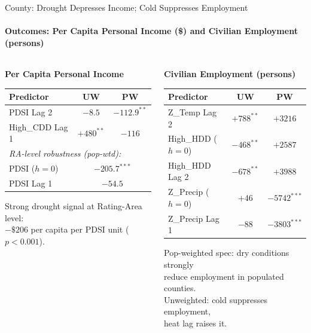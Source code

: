 \documentclass[aspectratio=169,11pt]{beamer}
\newcommand{\emphcolor}[1]{{\color{WarmOrange}\textbf{#1}}}
\newcommand{\tealtext}[1]{{\color{Teal}#1}}
\newcommand{\graytext}[1]{{\color{WarmGray}#1}}
\begin{document}
\begin{frame}{County: Drought Depresses Income; Cold Suppresses Employment}
  \framesubtitle{Outcomes: Per Capita Personal Income (\$) and Civilian Employment (persons)}
  \small
  \begin{columns}[T]
    \begin{column}{0.47\textwidth}
      \tealtext{\textbf{Per Capita Personal Income}}\\[0.3em]
      \begin{tabular}{lcc}
        \toprule
        Predictor & UW & PW \\
        \midrule
        PDSI Lag 2  & $-8.5$ & \emphcolor{$-112.9^{**}$} \\
        High\_CDD Lag 1 & \emphcolor{$+480^{**}$} & $-116$ \\
        \multicolumn{3}{l}{\textit{RA-level robustness (pop-wtd):}} \\
        PDSI ($h{=}0$) & \multicolumn{2}{c}{\emphcolor{$-205.7^{***}$}} \\
        PDSI Lag 1      & \multicolumn{2}{c}{$-54.5$} \\
        \bottomrule
      \end{tabular}
      \vspace{0.3em}
      \graytext{\scriptsize Strong drought signal at Rating-Area level:\\$-\$206$ per capita per PDSI unit ($p{<}0.001$).}
    \end{column}
    \begin{column}{0.47\textwidth}
      \tealtext{\textbf{Civilian Employment (persons)}}\\[0.3em]
      \begin{tabular}{lcc}
        \toprule
        Predictor & UW & PW \\
        \midrule
        Z\_Temp Lag 2       & \emphcolor{$+788^{**}$} & $+3216$ \\
        High\_HDD ($h{=}0$) & \emphcolor{$-468^{**}$} & $+2587$ \\
        High\_HDD Lag 2     & \emphcolor{$-678^{**}$} & $+3988$ \\
        Z\_Precip ($h{=}0$) & $+46$ & \emphcolor{$-5742^{***}$} \\
        Z\_Precip Lag 1     & $-88$ & \emphcolor{$-3803^{***}$} \\
        \bottomrule
      \end{tabular}
      \vspace{0.3em}
      \graytext{\scriptsize Pop-weighted spec: dry conditions strongly\\reduce employment in populated counties.\\Unweighted: cold suppresses employment,\\heat lag raises it.}
    \end{column}
  \end{columns}
\end{frame}
\end{document}
